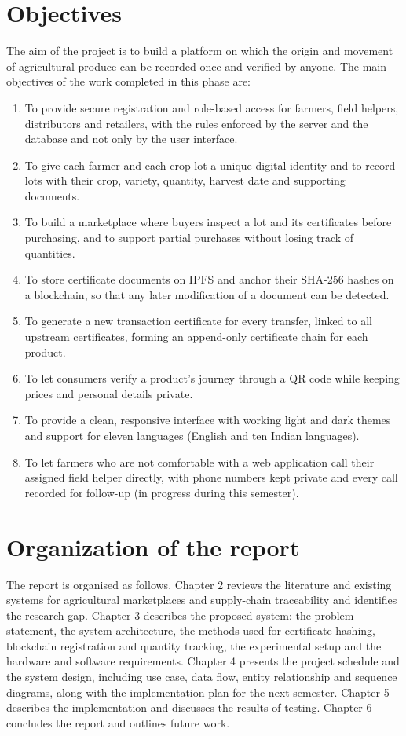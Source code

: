 \section{Objectives}\label{sec3}
The aim of the project is to build a platform on which the origin and movement of agricultural produce can be recorded once and verified by anyone. The main objectives of the work completed in this phase are:
\begin{enumerate}
	\item To provide secure registration and role-based access for farmers, field helpers, distributors and retailers, with the rules enforced by the server and the database and not only by the user interface.
	\item To give each farmer and each crop lot a unique digital identity and to record lots with their crop, variety, quantity, harvest date and supporting documents.
	\item To build a marketplace where buyers inspect a lot and its certificates before purchasing, and to support partial purchases without losing track of quantities.
	\item To store certificate documents on IPFS and anchor their SHA-256 hashes on a blockchain, so that any later modification of a document can be detected.
	\item To generate a new transaction certificate for every transfer, linked to all upstream certificates, forming an append-only certificate chain for each product.
	\item To let consumers verify a product's journey through a QR code while keeping prices and personal details private.
	\item To provide a clean, responsive interface with working light and dark themes and support for eleven languages (English and ten Indian languages).
	\item To let farmers who are not comfortable with a web application call their assigned field helper directly, with phone numbers kept private and every call recorded for follow-up (in progress during this semester).
\end{enumerate}

\section{Organization of the report}
The report is organised as follows. Chapter 2 reviews the literature and existing systems for agricultural marketplaces and supply-chain traceability and identifies the research gap. Chapter 3 describes the proposed system: the problem statement, the system architecture, the methods used for certificate hashing, blockchain registration and quantity tracking, the experimental setup and the hardware and software requirements. Chapter 4 presents the project schedule and the system design, including use case, data flow, entity relationship and sequence diagrams, along with the implementation plan for the next semester. Chapter 5 describes the implementation and discusses the results of testing. Chapter 6 concludes the report and outlines future work.
